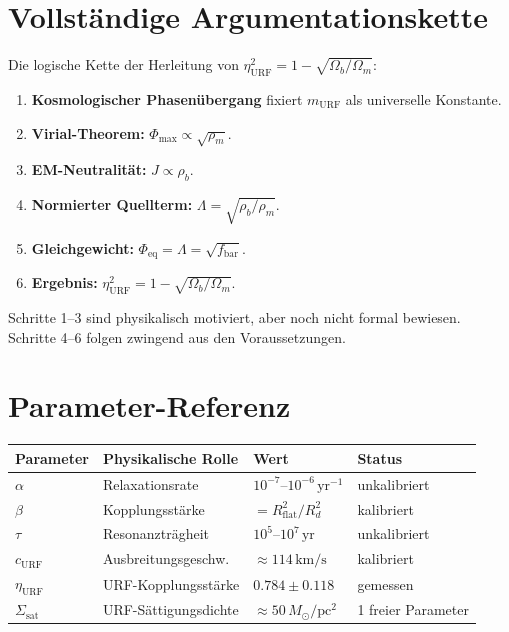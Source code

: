 \documentclass[12pt,a4paper]{article}
\theoremstyle{definition}
\begin{document}
\appendix

\section{Vollständige Argumentationskette}
\label{app:kette}

Die logische Kette der Herleitung von $\eta_{\mathrm{URF}}^2 = 1 - \sqrt{\Omega_b/\Omega_m}$:
\begin{enumerate}
\item \textbf{Kosmologischer Phasenübergang} fixiert $m_{\mathrm{URF}}$ als universelle Konstante.
\item \textbf{Virial-Theorem:} $\Phi_{\mathrm{max}} \propto \sqrt{\rho_m}$.
\item \textbf{EM-Neutralität:} $J \propto \rho_b$.
\item \textbf{Normierter Quellterm:} $\Lambda = \sqrt{\rho_b/\rho_m}$.
\item \textbf{Gleichgewicht:} $\Phi_{\mathrm{eq}} = \Lambda = \sqrt{f_{\mathrm{bar}}}$.
\item \textbf{Ergebnis:} $\eta_{\mathrm{URF}}^2 = 1 - \sqrt{\Omega_b/\Omega_m}$.
\end{enumerate}
Schritte 1--3 sind physikalisch motiviert, aber noch nicht formal bewiesen.
Schritte 4--6 folgen zwingend aus den Voraussetzungen.

\section{Parameter-Referenz}
\label{app:parameter}

\begin{center}
\begin{tabular}{p{2.5cm}p{5cm}p{3cm}p{2cm}}
\toprule
Parameter & Physikalische Rolle & Wert & Status \\
\midrule
$\alpha$ & Relaxationsrate & $10^{-7}$--$10^{-6}\,\mathrm{yr}^{-1}$ & unkalibriert \\
$\beta$ & Kopplungsstärke & $= R_{\mathrm{flat}}^2/R_d^2$ & kalibriert \\
$\tau$ & Resonanzträgheit & $10^5$--$10^7\,\mathrm{yr}$ & unkalibriert \\
$c_{\mathrm{URF}}$ & Ausbreitungsgeschw. & $\approx 114\,\mathrm{km/s}$ & kalibriert \\
$\eta_{\mathrm{URF}}$ & URF-Kopplungsstärke & $0.784 \pm 0.118$ & gemessen \\
$\Sigma_{\mathrm{sat}}$ & URF-Sättigungsdichte & $\approx 50\,M_\odot/\mathrm{pc}^2$ & 1 freier Parameter \\
\bottomrule
\end{tabular}
\end{center}
\end{document}
